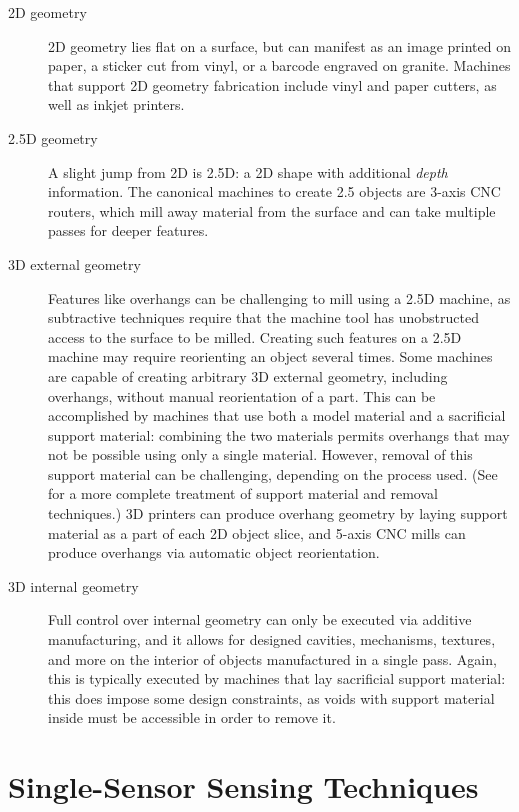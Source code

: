 \begin{description}

\item[2D geometry] 2D geometry lies flat on a surface, but can manifest as an image printed on paper, a sticker cut from vinyl, or a barcode engraved on granite. Machines that support 2D geometry fabrication include vinyl and paper cutters, as well as inkjet printers.

\item[2.5D geometry] A slight jump from 2D is 2.5D: a 2D shape with additional \emph{depth} information. The canonical machines to create 2.5 objects are 3-axis CNC routers, which mill away material from the surface and can take multiple passes for deeper features.

\item[3D external geometry] Features like overhangs can be challenging to mill using a 2.5D machine, as subtractive techniques require that the machine tool has unobstructed access to the surface to be milled. Creating such features on a 2.5D machine may require reorienting an object several times. Some machines are capable of creating arbitrary 3D external geometry, including overhangs, without manual reorientation of a part. This can be accomplished by machines that use both a model material and a sacrificial support material: combining the two materials permits overhangs that may not be possible using only a single material. However, removal of this support material can be challenging, depending on the process used. (See \cite{savage-sot} for a more complete treatment of support material and removal techniques.) 3D printers can produce overhang geometry by laying support material as a part of each 2D object slice, and 5-axis CNC mills can produce overhangs via automatic object reorientation.

\item[3D internal geometry] Full control over internal geometry can only be executed via additive manufacturing, and it allows for designed cavities, mechanisms, textures, and more on the interior of objects manufactured in a single pass. Again, this is typically executed by machines that lay sacrificial support material: this does impose some design constraints, as voids with support material inside must be accessible in order to remove it.

\end{description}

\section{Single-Sensor Sensing Techniques}

